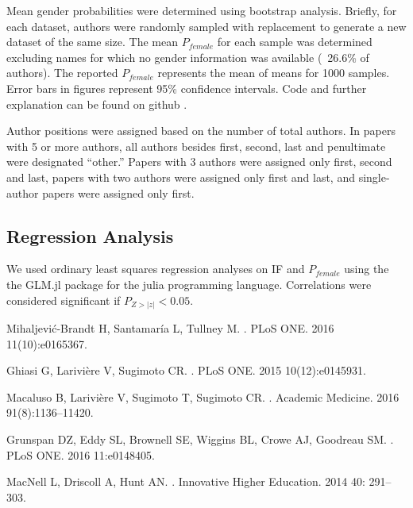 \documentclass[10pt,letterpaper]{article}
\begin{document}
\begin{flushleft}
Mean gender probabilities were determined using bootstrap analysis. Briefly, for each dataset, authors were randomly sampled with replacement to generate a new dataset of the same size. The mean $P_{female}$ for each sample was determined excluding names for which no gender information was available (~26.6\% of authors). The reported $P_{female}$ represents the mean of means for 1000 samples. Error bars in figures represent 95\% confidence intervals. Code and further explanation can be found on github \cite{Bonham2016b}.

Author positions were assigned based on the number of total authors. In papers with 5 or more authors, all authors besides first, second, last and penultimate were designated “other.” Papers with 3 authors were assigned only first, second and last, papers with two authors were assigned only first and last, and single-author papers were assigned only first.

\subsection*{Regression Analysis}
We used ordinary least squares regression analyses on IF and $P_{female}$ using the the GLM.jl package for the julia programming language. Correlations were considered significant if $P_{Z > |z|} < 0.05$.


\begin{thebibliography}{10}

  Mihaljevi{\'c}-Brandt H, Santamar{\'i}a L, Tullney M.
.
\newblock PLoS ONE. 2016 11(10):e0165367.

Ghiasi G, Larivi{\`e}re V, Sugimoto CR.
.
\newblock PLoS ONE. 2015 10(12):e0145931.

Macaluso B, Larivi{\`e}re V, Sugimoto T, Sugimoto CR.
.
\newblock Academic Medicine. 2016  91(8):1136–11420.

Grunspan DZ, Eddy SL, Brownell SE, Wiggins BL, Crowe AJ, Goodreau SM.
.
\newblock PLoS ONE. 2016 11:e0148405.

MacNell L, Driscoll A, Hunt AN.
.
\newblock   Innovative Higher Education. 2014 40: 291–303.


\end{thebibliography}
\end{flushleft}
\end{document}
